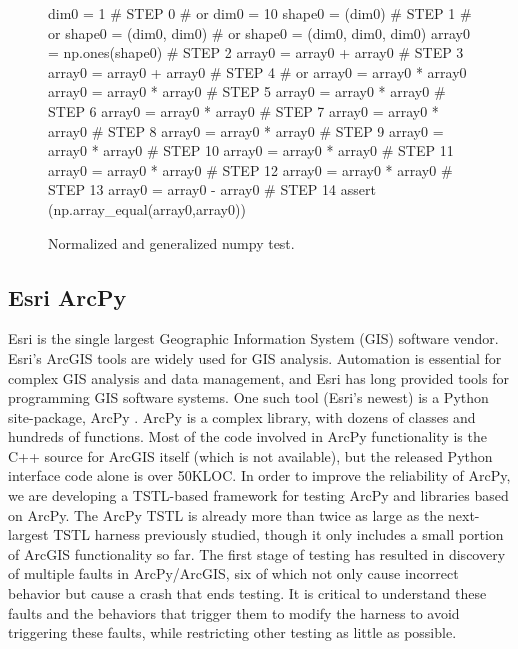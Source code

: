 \begin{figure}
{\scriptsize
\begin{code}
dim0 = 1                            \textcolor{black!60}{\# STEP 0}
\textcolor{black!60}{\#  or dim0 = 10 }
shape0 = (dim0)                     \textcolor{black!60}{\# STEP 1}
\textcolor{black!60}{\#  or shape0 = (dim0, dim0) }
\textcolor{black!60}{\#  or shape0 = (dim0, dim0, dim0) }
array0 = np.ones(shape0)            \textcolor{black!60}{\# STEP 2}
array0 = array0 + array0            \textcolor{black!60}{\# STEP 3}
array0 = array0 + array0            \textcolor{black!60}{\# STEP 4}
\textcolor{black!60}{\#  or array0 = array0 * array0 }
array0 = array0 * array0            \textcolor{black!60}{\# STEP 5}
array0 = array0 * array0            \textcolor{black!60}{\# STEP 6}
array0 = array0 * array0            \textcolor{black!60}{\# STEP 7}
array0 = array0 * array0            \textcolor{black!60}{\# STEP 8}
array0 = array0 * array0            \textcolor{black!60}{\# STEP 9}
array0 = array0 * array0            \textcolor{black!60}{\# STEP 10}
array0 = array0 * array0            \textcolor{black!60}{\# STEP 11}
array0 = array0 * array0            \textcolor{black!60}{\# STEP 12}
array0 = array0 * array0            \textcolor{black!60}{\# STEP 13}
array0 = array0 - array0            \textcolor{black!60}{\# STEP 14}
assert (np.array\_equal(array0,array0))
\end{code}
}
\caption{Normalized and generalized numpy test.}
\label{numpynormgen}
\end{figure}

\subsection{Esri ArcPy}

Esri is the single
largest Geographic Information System (GIS) software vendor.  Esri's ArcGIS tools are widely
used for GIS analysis.  Automation is essential for complex GIS analysis and
data management, and Esri has long provided tools
for programming GIS software systems.  One such tool
(Esri's newest) is a Python site-package, ArcPy \cite{ArcPy}.  ArcPy is a complex library,
with dozens of classes and hundreds of functions.  Most of the code involved in ArcPy
functionality is the C++ source for ArcGIS itself (which is not
available), but the released Python interface code alone is over 50KLOC.
In order to improve the reliability of ArcPy, we are developing a
TSTL-based framework for testing ArcPy and libraries
based on ArcPy.  The ArcPy TSTL is already more than twice as large as
the next-largest TSTL harness previously studied, though it only
includes a small portion of ArcGIS functionality so far. The first
stage of testing has resulted in discovery of multiple faults in
ArcPy/ArcGIS, six of which not only cause incorrect behavior but cause
a crash that ends testing.  It is critical to understand these
faults and the behaviors that trigger them to modify the harness to
avoid triggering these faults, while restricting other testing as
little as possible.

